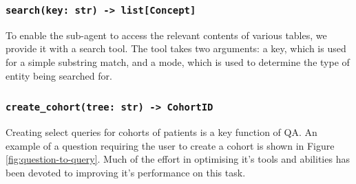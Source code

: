 \documentclass[11pt]{article}
\begin{document}
\subsubsection*{\texttt{search(key: str) -> list[Concept]}}
To enable the sub-agent to access the relevant contents of various tables, we provide it with a search tool.
The tool takes two arguments: a key, which is used for a simple substring match, and a mode, which is used to determine the type of entity being searched
for.

\subsubsection*{\texttt{create\_cohort(tree: str) -> CohortID}}
Creating select queries for cohorts of patients is a key function of QA.
An example of a question requiring the user to create a cohort is shown in Figure \ref{fig:question-to-query}.
Much of the effort in optimising it's tools and abilities has been devoted to improving it's performance on this task.






\end{document}
